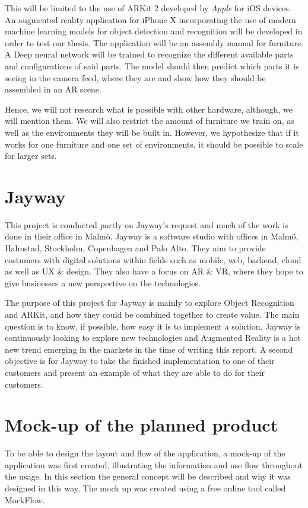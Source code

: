This will be limited to the use of ARKit 2 developed by \textit{Apple} for iOS devices. An augmented reality application for iPhone X incorporating the use of modern machine learning models for object detection and recognition will be developed in order to test our thesis. The application will be an assembly manual for furniture. A Deep neural network will be trained to recognize the different available parts and configurations of said parts.  The model should then predict which parts it is seeing in the camera feed, where they are and show how they should be assembled in an AR scene. 

Hence, we will not research what is possible with other hardware, although, we will mention them. We will also restrict the amount of furniture we train on, as well as the environments they will be built in. However, we hypothesize that if it works for one furniture and one set of environments, it should be possible to scale for larger sets.


\section{Jayway}
\label{subSecJayway}
This project is conducted partly on Jayway's request and much of the work is done in their office in Malmö.
Jayway is a software studio with offices in Malmö, Halmstad, Stockholm, Copenhagen and Palo Alto. They aim to provide costumers with digital solutions  within fields such as mobile, web, backend, cloud as well as UX \& design. They also have a focus on AR \& VR, where they hope to give businesses a new perspective on the technologies.


The purpose of this project for Jayway is mainly to explore Object Recognition  and ARKit, and how they could be combined together to create value. The main question is to know, if possible, how easy it is to implement a solution.
Jayway is continuously looking to explore new technologies and Augmented Reality is a hot new trend emerging in the markets in the time of writing this report.
A second objective is for Jayway to take the finished implementation to one of their customers and
present an example of what they are able to do for their customers.

\section{Mock-up of the planned product}
\label{subSecMockup}
To be able to design the layout and flow of the application, a mock-up of the application was first created, illustrating the information and use flow throughout the usage. In this section the general concept will be described and why it was designed in this way. The mock up was created using a free online tool called MockFlow\cite{mockflow}. 

